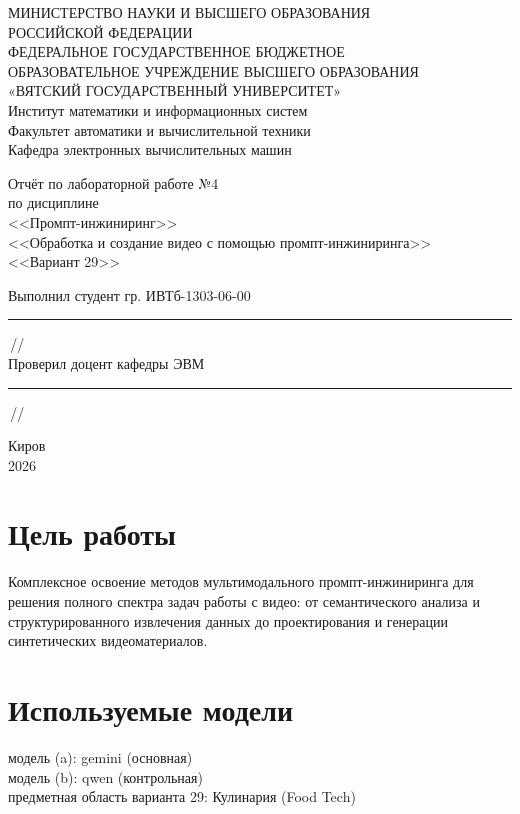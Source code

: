 \documentclass[oneside,a4paper,14pt]{extarticle} %
\begin{document}
	\newpage\thispagestyle{empty}
	\begin{center}
		МИНИСТЕРСТВО НАУКИ И ВЫСШЕГО ОБРАЗОВАНИЯ\\
		РОССИЙСКОЙ ФЕДЕРАЦИИ\\
		ФЕДЕРАЛЬНОЕ ГОСУДАРСТВЕННОЕ БЮДЖЕТНОЕ\\
		ОБРАЗОВАТЕЛЬНОЕ УЧРЕЖДЕНИЕ ВЫСШЕГО ОБРАЗОВАНИЯ\\
		«ВЯТСКИЙ ГОСУДАРСТВЕННЫЙ УНИВЕРСИТЕТ»\\
		Институт математики и информационных систем\\
		Факультет автоматики и вычислительной техники\\
		Кафедра электронных вычислительных машин
	\end{center}
	\vspace{20mm}
	\begin{center}
		Отчёт по лабораторной работе №4\\
		по дисциплине\\
		<<Промпт-инжиниринг>>\\
		<<Обработка и создание видео с помощью промпт-инжиниринга>>\\
		<<Вариант 29>>\\
	\end{center}
	\vspace{48mm}
	\noindent
	Выполнил студент гр. ИВТб-1303-06-00 \hfill \rule[-0.5mm]{30mm}{0.15mm}\,//\\[0.5cm]
	Проверил доцент кафедры ЭВМ \hfill \rule[-0.5mm]{30mm}{0.15mm}\,//
		\vfill
		\begin{center}
			Киров\\
			2026
		\end{center}
		\newpage
		\thispagestyle{empty}
		\newpage
		\section*{Цель работы}
		Комплексное освоение методов мультимодального промпт-инжиниринга для решения полного спектра задач работы с видео: от семантического анализа и структурированного извлечения данных до проектирования и генерации синтетических видеоматериалов.
		\section*{Используемые модели}
		\noindent
		\indent модель (a): gemini (основная)\\
		\indent модель (b): qwen (контрольная)\\
		\indent предметная область варианта 29: Кулинария (Food Tech)
		
\end{document}
